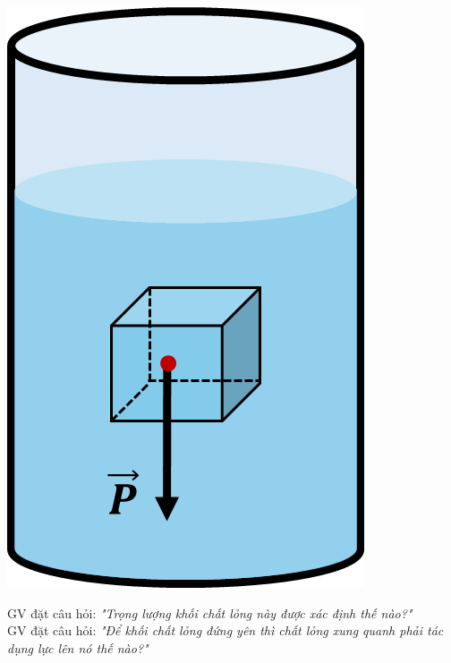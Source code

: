 {\begin{itemize}[label=-]
\begin{center}
			\includegraphics[scale=0.5]{figs/G10-BAI11-14}
		\end{center}
		GV đặt câu hỏi: \textit{"Trọng lượng khối chất lỏng này được xác định thế nào?"}\\
		GV đặt câu hỏi: \textit{"Để khối chất lỏng đứng yên thì chất lỏng xung quanh phải tác dụng lực lên nó thế nào?"}
		\begin{center}

\end{center}
\end{itemize}}
